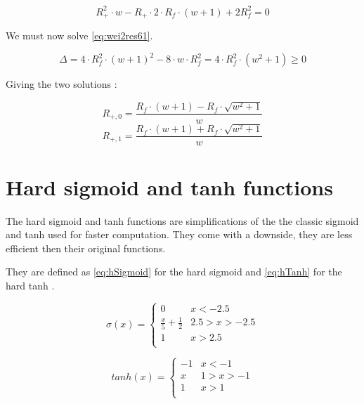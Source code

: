 \begin{equation}\label{eq:wei2res61}
  R_+^2\cdot w - R_+\cdot 2\cdot R_f \cdot(w+1) + 2R_f^2 = 0
\end{equation}

We must now solve \cref{eq:wei2res61}.

\begin{equation}\label{eq:wei2res61}
  \Delta = 4\cdot R_f^2\cdot(w+1)^2-8\cdot w\cdot R_f^2 = 4\cdot R_f^2\cdot(w^2+1) \ge 0
\end{equation}

Giving the two solutions :

\begin{equation}\label{eq:wei2res62}
  R_{+,0}=\frac{R_f\cdot(w+1)-R_f\cdot\sqrt{w^2+1}}{w}
\end{equation}
\begin{equation}\label{eq:wei2res63}
  R_{+,1}=\frac{R_f\cdot(w+1)+R_f\cdot\sqrt{w^2+1}}{w}
\end{equation}

\section{Hard sigmoid and \ac{tanh} functions}\label{apsec:hardFunc}

The hard sigmoid and \ac{tanh} functions are simplifications of the the classic sigmoid and \ac{tanh} used for faster computation. They come with a downside, they are less efficient then their original functions.

They are defined as \cref{eq:hSigmoid} for the hard sigmoid and \cref{eq:hTanh} for the hard \ac{tanh} \cite{hSigmoid, hTanh}.


\begin{equation}\label{eq:hSigmoid}
  \sigma (x) =
  \begin{cases}
    0& x< -2.5\\
    \frac{x}{5}+\frac{1}{2}&  2.5>x>-2.5\\
    1& x> 2.5\\
  \end{cases}
\end{equation}

\begin{equation}\label{eq:hTanh}
  tanh(x) =
  \begin{cases}
    -1& x<-1\\
    x& 1>x>-1\\
    1& x>1\\
  \end{cases}
\end{equation}

